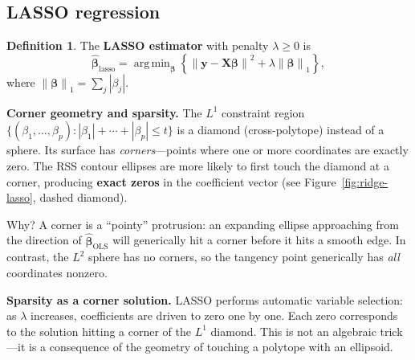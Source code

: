 \documentclass[11pt,a4paper]{article}
\theoremstyle{plain}
\theoremstyle{definition}
\newtheorem{definition}[theorem]{Definition}
\newcommand{\bhat}{\hat{\bm{\beta}}}
\newcommand{\bX}{\bm{X}}
\newcommand{\by}{\bm{y}}
\newcommand{\norm}[1]{\left\lVert #1 \right\rVert}
\DeclareMathOperator*{\argmin}{arg\,min}
\begin{document}
\subsection{LASSO regression}

\begin{definition}
The \textbf{LASSO estimator} with penalty $\lambda\ge 0$ is
\[
  \bhat_{\text{lasso}}
  = \argmin_{\bm{\beta}}\left\{
      \norm{\by-\bX\bm{\beta}}^2 + \lambda\norm{\bm{\beta}}_1
    \right\},
\]
where $\norm{\bm{\beta}}_1 = \sum_j|\beta_j|$.
\end{definition}

\noindent\textbf{Corner geometry and sparsity.}
The $L^1$ constraint region
$\{(\beta_1,\dots,\beta_p) : |\beta_1|+\cdots+|\beta_p| \le t\}$
is a diamond (cross-polytope) instead of a sphere.
Its surface has \emph{corners}---points where one or more coordinates
are exactly zero.
The RSS contour ellipses are more likely to first touch the diamond
at a corner, producing \textbf{exact zeros} in the coefficient vector
(see Figure~\ref{fig:ridge-lasso}, dashed diamond).

Why?
A corner is a ``pointy'' protrusion: an expanding ellipse approaching
from the direction of $\bhat_{\text{OLS}}$ will generically hit a
corner before it hits a smooth edge.
In contrast, the $L^2$ sphere has no corners, so the tangency point
generically has \emph{all} coordinates nonzero.

\medskip
\noindent\textbf{Sparsity as a corner solution.}
LASSO performs automatic variable selection: as $\lambda$ increases,
coefficients are driven to zero one by one.
Each zero corresponds to the solution hitting a corner of the $L^1$
diamond.
This is not an algebraic trick---it is a consequence of the geometry
of touching a polytope with an ellipsoid.
\end{document}

